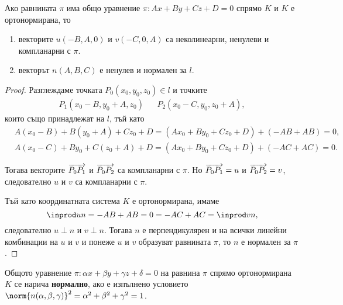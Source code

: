 \documentclass{../../common/topic}
\begin{document}
\begin{proposition}
  Ако равнината \( \pi \) има общо уравнение \( \pi: Ax + By + Cz + D = 0 \) спрямо \( K \) и \( K \) е ортонормирана, то
  \begin{enumerate}
    \item векторите \( u(-B, A, 0) \) и \( v(-C, 0, A) \) са неколинеарни, ненулеви и компланарни с \( \pi \).
    \item векторът \( n(A, B, C) \) е ненулев и нормален за \( l \).
  \end{enumerate}
\end{proposition}
\begin{proof}
  \item Разглеждаме точката \( P_0(x_0, y_0, z_0) \in l \) и точките
  \begin{align*}
    P_1(x_0 - B, y_0 + A, z_0)
    &&
    P_2(x_0 - C, y_0, z_0 + A),
  \end{align*}
  които също принадлежат на \( l \), тъй като
  \begin{align*}
    &A(x_0 - B) + B(y_0 + A) + Cz_0 + D = (Ax_0 + By_0 + Cz_0 + D) + (-AB + AB) = 0, \\
    &A(x_0 - C) + By_0 + C(z_0 + A) + D = (Ax_0 + By_0 + Cz_0 + D) + (-AC + AC) = 0.
  \end{align*}

  Тогава векторите \( \overrightarrow{P_0 P_1} \) и \( \overrightarrow{P_0 P_2} \) са компланарни с \( \pi \). Но \( \overrightarrow{P_0 P_1} = u \) и \( \overrightarrow{P_0 P_2} = v \), следователно \( u \) и \( v \) са компланарни с \( \pi \).

  \item Тъй като координатната система \( K \) е ортонормирана, имаме
  \begin{equation*}
    \inprod u n = -AB + AB = 0 = -AC + AC = \inprod v n,
  \end{equation*}
  следователно \( u \perp n \) и \( v \perp n \). Тогава \( n \) е перпендикулярен и на всички линейни комбинации на \( u \) и \( v \) и понеже \( u \) и \( v \) образуват равнината \( \pi \), то \( n \) е нормален за \( \pi \).
\end{proof}

\begin{definition}
  Общото уравнение \( \pi: \alpha x + \beta y + \gamma z + \delta = 0 \) на равнина \( \pi \) спрямо ортонормирана \( K \) се нарича \textbf{нормално}, ако е изпълнено условието \( \norm{n(\alpha, \beta, \gamma)}^2 = \alpha^2 + \beta^2 + \gamma^2 = 1 \).
\end{definition}
\end{document}
